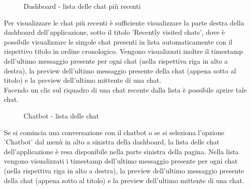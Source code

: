 \documentclass[10pt, a4paper]{article}
\begin{document}
   
    \begin{figure}[H]
        \centering  
        \caption{Dashboard - lista delle chat più recenti}
    \end{figure}
    Per visualizzare le chat più recenti è sufficiente visualizzare la parte destra della dashboard dell'applicazione, sotto il titolo 'Recently visited chats', dove è possibile visualizzare le singole chat presenti in lista automaticamente con il rispettivo titolo in ordine cronologico. Vengono visualizzati inoltre il timestamp dell'ultimo messaggio presente per ogni chat (nella rispettiva riga in alto a destra), la preview dell'ultimo messaggio presente della chat (appena sotto al titolo) e la preview dell'ultimo mittente di una chat.\\
    Facendo un clic sul riquadro di una chat recente dalla lista è possibile aprire tale chat.

    \begin{figure}[H]
        \centering  
        \caption{Chatbot - lista delle chat}
    \end{figure}
    Se si comincia una conversazione con il chatbot o se si seleziona l'opzione 'Chatbot' dal menù in alto a sinistra della dashboard, la lista delle chat dell'applicazione è resa disponibile nella parte sinistra della pagina. Nella lista vengono visualizzati i timestamp dell'ultimo messaggio presente per ogni chat (nella rispettiva riga in alto a destra), la preview dell'ultimo messaggio presente della chat (appena sotto al titolo) e la preview dell'ultimo mittente di una chat.
\end{document}
